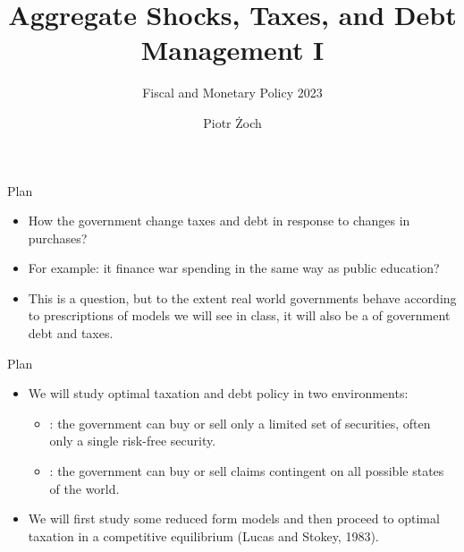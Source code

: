 \documentclass[11pt,xcolor={dvipsnames},hyperref={pdftex,pdfpagemode=UseNone,hidelinks,pdfdisplaydoctitle=true},usepdftitle=false]{beamer}
\begin{document}
\title{Aggregate Shocks, Taxes, and Debt Management I}
\subtitle{Fiscal and Monetary Policy 2023}

\author{Piotr Żoch}%
\frame{\titlepage}

\begin{frame}{Plan}
    \begin{itemize}
    \item How  the government change taxes and debt in response
    to changes in purchases?
    \item For example:  it finance war spending in the same way
    as public education?
    \item This is a  question, but to the extent real world
    governments behave according to prescriptions of models we will see
    in class, it will also be a  of government debt
    and taxes.
    \end{itemize}
\end{frame}


\begin{frame}{Plan}

    \begin{itemize}
    \item We will study optimal taxation and debt policy in two environments:
    \begin{itemize}
    \item {}: the government can buy or sell only a limited
    set of securities, often only a single risk-free security.
    \item {}: the government can buy or sell claims contingent
    on all possible states of the world.
    \end{itemize}
    \item We will first study some reduced form models and then proceed to optimal
    taxation in a competitive equilibrium (Lucas and Stokey, 1983).
    \end{itemize}
\end{frame}
    \begin{frame}
    \end{frame}
\end{document}
